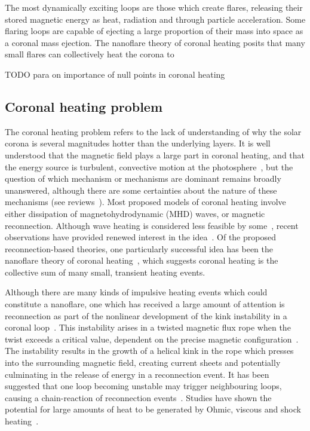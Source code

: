 The most dynamically exciting loops are those which create flares, releasing their stored magnetic energy as heat, radiation and through particle acceleration. Some flaring loops are capable of ejecting a large proportion of their mass into space as a coronal mass ejection. The nanoflare theory of coronal heating posits that many small flares can collectively heat the corona to 

TODO para on importance of null points in coronal heating

\subsection{Coronal heating problem}

The coronal heating problem refers to the lack of understanding of why the solar corona is several magnitudes hotter than the underlying layers. It is well understood that the magnetic field plays a large part in coronal heating, and that the energy source is turbulent, convective motion at the photosphere~\cite{browningMechanismsSolarCoronal1991}, but the question of which mechanism or mechanisms are dominant remains broadly unanswered, although there are some certainties about the nature of these mechanisms (see reviews~\cite{demoortelRecentAdvancesCoronal2015,realeCoronalLoopsObservations2014}). Most proposed models of coronal heating involve either dissipation of magnetohydrodynamic (MHD) waves, or magnetic reconnection. Although wave heating is considered less feasible by some~\cite{klimchukSolvingCoronalHeating2006a}, recent observations have provided renewed interest in the idea~\cite{hahnEvidenceWaveHeating2013,demoortelRecentAdvancesCoronal2015,mcintoshAlfvenicWavesSufficient2011,jessAlfvenWavesLower2009,depontieuChromosphericAlfvenicWaves2007}. Of the proposed reconnection-based theories, one particularly successful idea has been the nanoflare theory of coronal heating~\cite{klimchukSolvingCoronalHeating2006a}, which suggests coronal heating is the collective sum of many small, transient heating events. 

Although there are many kinds of impulsive heating events which could constitute a nanoflare, one which has received a large amount of attention is reconnection as part of the nonlinear development of the kink instability in a coronal loop~\cite{hoodKinkInstabilitySolar1979,browningSolarCoronalHeating2003c,hoodCoronalHeatingMagnetic2009,browningHeatingCoronaNanoflares2008a}. This instability arises in a twisted magnetic flux rope when the twist exceeds a critical value, dependent on the precise magnetic configuration~\cite{hoodCoronalHeatingMagnetic2009}. The instability results in the growth of a helical kink in the rope which presses into the surrounding magnetic field, creating current sheets and potentially culminating in the release of energy in a reconnection event. It has been suggested that one loop becoming unstable may trigger neighbouring loops, causing a chain-reaction of reconnection events~\cite{hoodMHDAvalancheModel2015}. Studies have shown the potential for large amounts of heat to be generated by Ohmic, viscous and shock heating~\cite{barefordShockHeatingNumerical2015,hoodCoronalHeatingMagnetic2009}.

